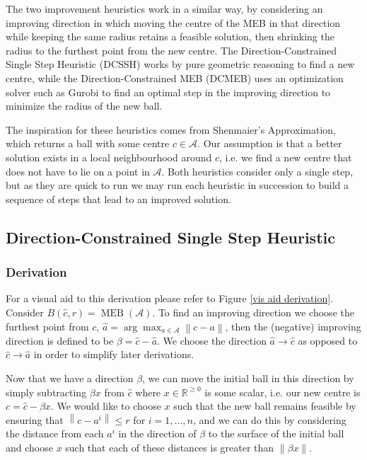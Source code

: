 \documentclass[11pt,twoside]{report}
\newcommand{\A}{\mathcal{A}} %
\newcommand{\norm}[1]{\left\lVert#1\right\rVert} %
\DeclareMathOperator{\MEB}{MEB}
\theoremstyle{definition}
\numberwithin{theorem}{section}
\numberwithin{definition}{section}
\numberwithin{lemma}{section}
\numberwithin{proposition}{section}
\numberwithin{equation}{section}
\numberwithin{figure}{section}
\begin{document}
The two improvement heuristics work in a similar way, by considering an improving direction in which moving the centre of the MEB in that direction while keeping the same radius retains a feasible solution, then shrinking the radius to the furthest point from the new centre. The Direction-Constrained Single Step Heuristic (DCSSH) works by pure geometric reasoning to find a new centre, while the Direction-Constrained MEB (DCMEB) uses an optimization solver such as Gurobi to find an optimal step in the improving direction to minimize the radius of the new ball.

The inspiration for these heuristics comes from Shenmaier's Approximation, which returns a ball with some centre $c\in\A$. Our assumption is that a better solution exists in a local neighbourhood around $c$, i.e. we find a new centre that does not have to lie on a point in $\A$. Both heuristics consider only a single step, but as they are quick to run we may run each heuristic in succession to build a sequence of steps that lead to an improved solution.

\subsection{Direction-Constrained Single Step Heuristic}
\subsubsection{Derivation}
For a visual aid to this derivation please refer to Figure \ref{vis aid derivation}. Consider $B(\hat{c}, r) = \MEB(\A)$. To find an improving direction we choose the furthest point from $c$, $\hat{a}=\arg\max_{a\in\A}\norm{c-a}$, then the (negative) improving direction is defined to be $\beta=\hat{c}-\hat{a}$. We choose the direction $\hat{a}\to\hat{c}$ as opposed to $\hat{c}\to\hat{a}$ in order to simplify later derivations.

Now that we have a direction $\beta$, we can move the initial ball in this direction by simply subtracting $\beta x$ from $\hat{c}$ where $x\in\mathbb{R}^{\geq0}$ is some scalar, i.e. our new centre is $c=\hat{c}-\beta x$. We would like to choose $x$ such that the new ball remains feasible by ensuring that $\norm{c-a^i}\leq r$ for $i=1,\ldots,n$, and we can do this by considering the distance from each $a^i$ in the direction of $\beta$ to the surface of the initial ball and choose $x$ such that each of these distances is greater than $\norm{\beta x}$.
\end{document}

